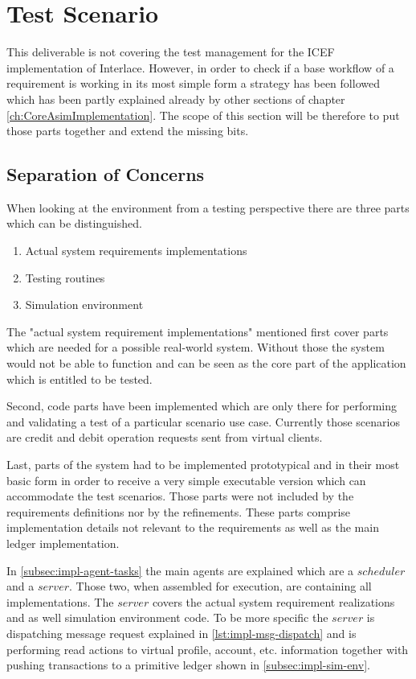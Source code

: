 \section{Test Scenario}
\label{sec:impl-test}

This deliverable is not covering the test management for the ICEF implementation of Interlace. However, in order to check if a base workflow of a requirement is working in its most simple form a strategy has been followed which has been partly explained already by other sections of chapter \ref{ch:CoreAsimImplementation}. The scope of this section will be therefore to put those parts together and extend the missing bits.

\subsection{Separation of Concerns}

When looking at the environment from a testing perspective there are three parts which can be distinguished. 

\begin{enumerate}
	\item Actual system requirements implementations
	\item Testing routines
	\item Simulation environment
\end{enumerate}

The "actual system requirement implementations" mentioned first cover parts which are needed for a possible real-world system. Without those the system would not be able to function and can be seen as the core part of the application which is entitled to be tested.

Second, code parts have been implemented which are only there for performing and validating a test of a particular scenario use case. Currently those scenarios are credit and debit operation requests sent from virtual clients.

Last, parts of the system had to be implemented prototypical and in their most basic form in order to receive a very simple executable version which can accommodate the test scenarios. Those parts were not included by the requirements definitions nor by the refinements. These parts comprise implementation details not relevant to the requirements as well as the main ledger implementation.

In \ref{subsec:impl-agent-tasks} the main agents are explained which are a $scheduler$ and a $server$. Those two, when assembled for execution, are containing all implementations. The $server$ covers the actual system requirement realizations and as well simulation environment code. To be more specific the $server$ is dispatching message request explained in \ref{lst:impl-msg-dispatch} and is performing read actions to virtual profile, account, etc. information together with pushing transactions to a primitive ledger shown in \ref{subsec:impl-sim-env}.

